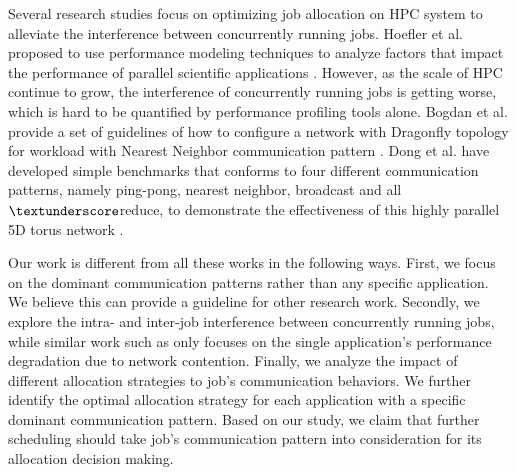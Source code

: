 Several research studies focus on optimizing job allocation on HPC system to alleviate the interference between concurrently running jobs. Hoefler et al. proposed to use performance modeling techniques to analyze factors that impact the performance of parallel scientific applications \cite{hoefler-modeling}. However, as the scale of HPC continue to grow, the  interference of concurrently running jobs is getting worse, which is hard to be quantified by performance profiling tools alone. Bogdan et al. provide a set of guidelines of how to configure a network with Dragonfly topology for workload with Nearest Neighbor communication pattern \cite{Bogdan-hpdc14}. Dong et al. have developed simple benchmarks that conforms to four different communication patterns, namely ping-pong, nearest neighbor, broadcast and all$\textunderscore$reduce, to demonstrate the effectiveness of this highly parallel 5D torus network \cite{Dong-SC11}.

Our work is different from all these works in the following ways. First, we focus on the dominant communication patterns rather than any specific application. We believe this can provide a guideline for other research work. Secondly, we explore the intra- and inter-job interference between concurrently running jobs, while similar work such as \cite{abhinav-sc13} only focuses on the single application's performance degradation due to network contention. Finally, we analyze the impact of different allocation strategies to job's communication behaviors. We further identify the optimal allocation strategy for each application with a specific dominant communication pattern. Based on our study, we claim that further scheduling should take job's communication pattern into consideration for its allocation decision making. 


